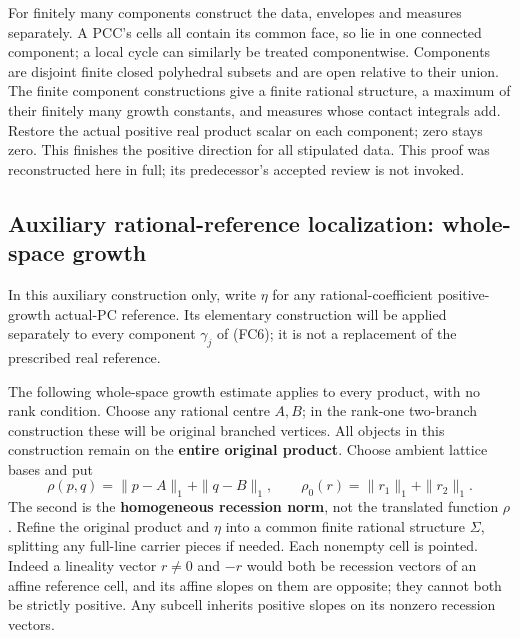 \documentclass[
  11pt,
]{article}
\begin{document}
For finitely many components construct the data, envelopes and measures
separately. A PCC's cells all contain its common face, so lie in one
connected component; a local cycle can similarly be treated
componentwise. Components are disjoint finite closed polyhedral subsets
and are open relative to their union. The finite component constructions
give a finite rational structure, a maximum of their finitely many
growth constants, and measures whose contact integrals add. Restore the
actual positive real product scalar on each component; zero stays zero.
This finishes the positive direction for all stipulated data. This proof
was reconstructed here in full; its predecessor's accepted review is not
invoked.

\subsection{Auxiliary rational-reference localization: whole-space
growth}\label{auxiliary-rational-reference-localization-whole-space-growth}

In this auxiliary construction only, write \(\eta\) for any
rational-coefficient positive-growth actual-PC reference. Its elementary
construction will be applied separately to every component \(\gamma_j\)
of (FC6); it is not a replacement of the prescribed real reference.

The following whole-space growth estimate applies to every product, with
no rank condition. Choose any rational centre \(A,B\); in the rank-one
two-branch construction these will be original branched vertices. All
objects in this construction remain on the \textbf{entire original
product}. Choose ambient lattice bases and put \[
\rho(p,q)=\|p-A\|_1+\|q-B\|_1,\qquad
\rho_0(r)=\|r_1\|_1+\|r_2\|_1.                               \tag{28}
\] The second is the \textbf{homogeneous recession norm}, not the
translated function \(\rho\). Refine the original product and \(\eta\)
into a common finite rational structure \(\Sigma\), splitting any
full-line carrier pieces if needed. Each nonempty cell is pointed.
Indeed a lineality vector \(r\ne0\) and \(-r\) would both be recession
vectors of an affine reference cell, and its affine slopes on them are
opposite; they cannot both be strictly positive. Any subcell inherits
positive slopes on its nonzero recession vectors.
\end{document}
